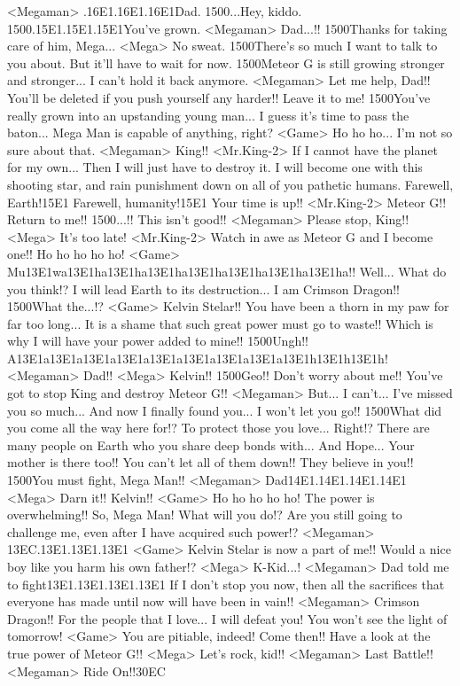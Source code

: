 <Megaman> .{16}{E1}.{16}{E1}.{16}{E1}Dad. 
{15}{00}...Hey, kiddo. 
{15}{00}.{15}{E1}.{15}{E1}.{15}{E1}You've grown. 
<Megaman> Dad...!! 
{15}{00}Thanks for taking care of him, Mega... 
<Mega> No sweat. 
{15}{00}There's so much I want to talk to you about. But it'll have to wait for now. 
{15}{00}Meteor G is still growing stronger and stronger... 
I can't hold it back anymore. 
<Megaman> Let me help, Dad!! 
You'll be deleted if you push yourself any harder!! 
Leave it to me! 
{15}{00}You've really grown into an upstanding young man... 
I guess it's time to pass the baton... 
Mega Man is capable of anything, right? 
<Game> Ho ho ho... 
I'm not so sure about that. 
<Megaman> King!! 
<Mr.King-2> If I cannot have the planet for my own... 
Then I will just have to destroy it. 
I will become one with this shooting star, and rain 
punishment down on all of you pathetic humans. 
Farewell, Earth!{15}{E1} Farewell, humanity!{15}{E1} 
Your time is up!! 
<Mr.King-2> Meteor G!! Return to me!! 
{15}{00}...!! This isn't good!! 
<Megaman> Please stop, King!! 
<Mega> It's too late! 
<Mr.King-2> Watch in awe as Meteor G and I become one!! 
Ho ho ho ho ho! 
<Game> Mu{13}{E1}wa{13}{E1}ha{13}{E1}ha{13}{E1}ha{13}{E1}ha{13}{E1}ha{13}{E1}ha{13}{E1}ha!! 
Well... What do you think!? 
I will lead Earth to its destruction... I am Crimson Dragon!! 
{15}{00}What the...!? 
<Game> Kelvin Stelar!! 
You have been a thorn in my paw for far too long... 
It is a shame that such great power must go to waste!! 
Which is why I will have your power added to mine!! 
{15}{00}Ungh!! A{13}{E1}a{13}{E1}a{13}{E1}a{13}{E1}a{13}{E1}a{13}{E1}a{13}{E1}a{13}{E1}a{13}{E1}h{13}{E1}h{13}{E1}h! 
<Megaman> Dad!! 
<Mega> Kelvin!! 
{15}{00}Geo!! Don't worry about me!! 
You've got to stop King and destroy Meteor G!! 
<Megaman> But... I can't... 
I've missed you so much... And now I finally found you... 
I won't let you go!! 
{15}{00}What did you come all the way here for!? 
To protect those you love... Right!? 
There are many people on Earth who you share deep bonds with... 
And Hope... Your mother is there too!! 
You can't let all of them down!! They believe in you!! 
{15}{00}You must fight, Mega Man!! 
<Megaman> Dad{14}{E1}.{14}{E1}.{14}{E1}.{14}{E1} 
<Mega> Darn it!! Kelvin!! 
<Game> Ho ho ho ho ho! The power is overwhelming!! 
So, Mega Man! What will you do!? 
Are you still going to challenge me, even after I have acquired such power!? 
<Megaman> {13}{EC}.{13}{E1}.{13}{E1}.{13}{E1} 
<Game> Kelvin Stelar is now a part of me!! 
Would a nice boy like you harm his own father!? 
<Mega> K-Kid...! 
<Megaman> Dad told me to fight{13}{E1}.{13}{E1}.{13}{E1}.{13}{E1} 
If I don't stop you now, then all the sacrifices that 
everyone has made until now will have been in vain!! 
<Megaman> Crimson Dragon!! 
For the people that I love... 
I will defeat you! You won't see the light of tomorrow! 
<Game> You are pitiable, indeed! 
Come then!! 
Have a look at the true power of Meteor G!! 
<Mega> Let's rock, kid!! 
<Megaman> Last Battle!! 
<Megaman> Ride On!!{30}{EC}
